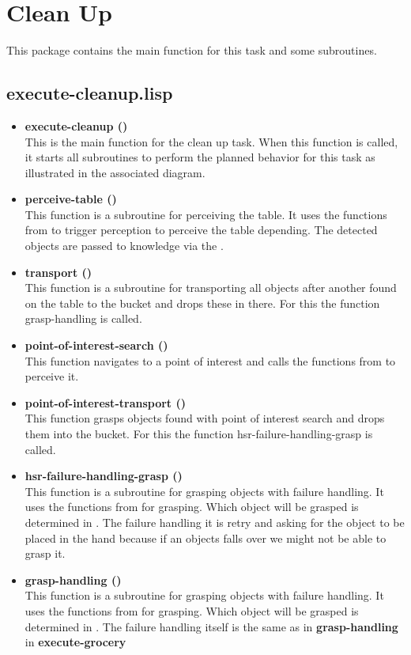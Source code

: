 \documentclass[main.tex]{subfiles}
\begin{document}
	  	\section{Clean Up}
	  	\label{clean}
	  	This package contains the main function for this task and some subroutines.
	  	\subsection{execute-cleanup.lisp}
	  	\begin{itemize}
			\item \textbf{execute-cleanup ()} \\
			This is the main function for the clean up task. When this function is called, it starts all subroutines to perform the planned behavior for this task as illustrated in the associated diagram.
			\item \textbf{perceive-table ()} \\
			This function is a subroutine for perceiving the table. It uses the functions from  to trigger perception to perceive the table depending. The detected objects are passed to knowledge via the .
			\item \textbf{transport ()} \\
            This function is a subroutine for transporting all objects after another found on the table to the bucket and drops these in there. For this the function grasp-handling is called.
			\item \textbf{point-of-interest-search ()} \\
			This function navigates to a point of interest and calls the functions from  to perceive it. 
			\item \textbf{point-of-interest-transport ()} \\
			This function grasps objects found with point of interest search and drops them into the bucket. For this the function hsr-failure-handling-grasp is called.
			\item \textbf{hsr-failure-handling-grasp ()} \\
			This function is a subroutine for grasping objects with failure handling. It uses the functions from  for grasping. Which object will be grasped is determined in . The failure handling it is retry and asking for the object to be placed in the hand because if an objects falls over we might not be  able to grasp it.
			\item \textbf{grasp-handling ()}\\
			This function is a subroutine for grasping objects with failure handling. It uses the functions from  for grasping. Which object will be grasped is determined in . The failure handling itself is the same as in   
\textbf{grasp-handling} in \textbf{execute-grocery}
		\end{itemize}
\end{document}
